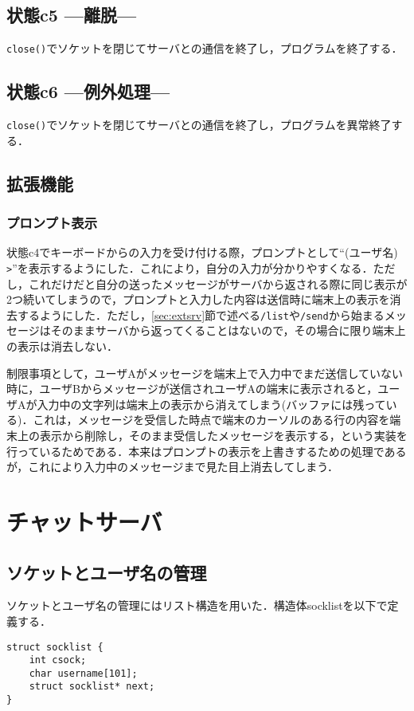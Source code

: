 \documentclass[a4j,10pt,titlepage]{jsarticle}
\begin{document}
\subsection{状態c5 ---離脱---}
\verb|close()|でソケットを閉じてサーバとの通信を終了し，プログラムを終了する．

\subsection{状態c6 ---例外処理---}
\verb|close()|でソケットを閉じてサーバとの通信を終了し，プログラムを異常終了する．

\subsection{拡張機能}
\subsubsection{プロンプト表示}\label{sec:prompt}
状態c4でキーボードからの入力を受け付ける際，プロンプトとして``(ユーザ名) \verb|>|''を表示するようにした．これにより，自分の入力が分かりやすくなる．ただし，これだけだと自分の送ったメッセージがサーバから返される際に同じ表示が2つ続いてしまうので，プロンプトと入力した内容は送信時に端末上の表示を消去するようにした．ただし，\ref{sec:extsrv}節で述べる\verb|/list|や\verb|/send|から始まるメッセージはそのままサーバから返ってくることはないので，その場合に限り端末上の表示は消去しない．

制限事項として，ユーザAがメッセージを端末上で入力中でまだ送信していない時に，ユーザBからメッセージが送信されユーザAの端末に表示されると，ユーザAが入力中の文字列は端末上の表示から消えてしまう(バッファには残っている)．これは，メッセージを受信した時点で端末のカーソルのある行の内容を端末上の表示から削除し，そのまま受信したメッセージを表示する，という実装を行っているためである．本来はプロンプトの表示を上書きするための処理であるが，これにより入力中のメッセージまで見た目上消去してしまう．

\section{チャットサーバ}
\subsection{ソケットとユーザ名の管理}
ソケットとユーザ名の管理にはリスト構造を用いた．構造体socklistを以下で定義する．
\begin{verbatim}
struct socklist {
    int csock;
    char username[101];
    struct socklist* next;
}
\end{verbatim}
\end{document}
